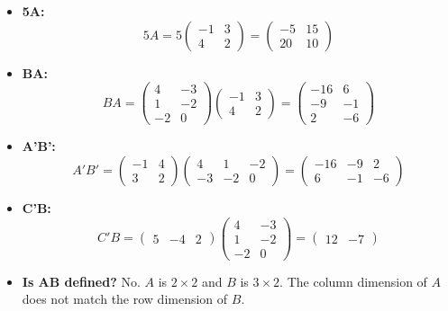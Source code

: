 \documentclass{article}
\begin{document}
\begin{itemize}
    \item[(a)] \textbf{5A:}
    \[
    5A = 5 \begin{pmatrix}-1&3\\ 4&2\end{pmatrix} = \begin{pmatrix}-5&15\\ 20&10\end{pmatrix}
    \]
    \item[(b)] \textbf{BA:}
    \[
    BA = \begin{pmatrix}4&-3\\ 1&-2\\ -2&0\end{pmatrix} \begin{pmatrix}-1&3\\ 4&2\end{pmatrix} = \begin{pmatrix}-16&6\\ -9&-1\\ 2&-6\end{pmatrix}
    \]
    \item[(c)] \textbf{A'B':}
    \[
    A'B' = \begin{pmatrix}-1&4\\ 3&2\end{pmatrix} \begin{pmatrix}4&1&-2\\ -3&-2&0\end{pmatrix} = \begin{pmatrix}-16&-9&2\\ 6&-1&-6\end{pmatrix}
    \]
    \item[(d)] \textbf{C'B:}
    \[
    C'B = \begin{pmatrix}5 & -4 & 2\end{pmatrix} \begin{pmatrix}4&-3\\ 1&-2\\ -2&0\end{pmatrix} = \begin{pmatrix}12 & -7\end{pmatrix}
    \]
    \item[(e)] \textbf{Is AB defined?} No. $A$ is $2 \times 2$ and $B$ is $3 \times 2$. The column dimension of $A$ does not match the row dimension of $B$.
\end{itemize}
\end{document}
